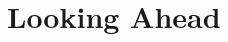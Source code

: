 \documentclass[notes,11pt, aspectratio=169]{beamer}
\newenvironment{wideitemize}{\itemize\addtolength{\itemsep}{10pt}}{\enditemize}
\begin{document}


\section{Looking Ahead}

\end{document}
